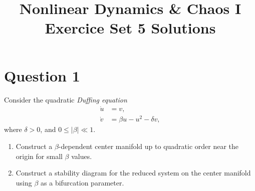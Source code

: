 \documentclass[twoside,10pt,a4paper]{article}
\title{\huge \textbf{Nonlinear Dynamics \& Chaos I \\ \Large Exercice Set 5 Solutions}}	%
\author{ }		%
\date{ }	%
\begin{document}
\maketitle

\section*{Question 1}
Consider the quadratic \textit{Duffing equation}
\begin{align*}
	\dot{u} &= v, \\
	\dot{v} &= \beta u - u^2 - \delta v,
\end{align*}
where $\delta > 0$, and $0 \leq |\beta| \ll 1$.

\begin{enumerate}[label=(\alph*)]
	\item Construct a $\beta$-dependent center manifold up to quadratic order near the origin for small $\beta$ values.
	\item Construct a stability diagram for the reduced system on the center manifold using $\beta$ as a bifurcation parameter.
\end{enumerate}
\end{document}
